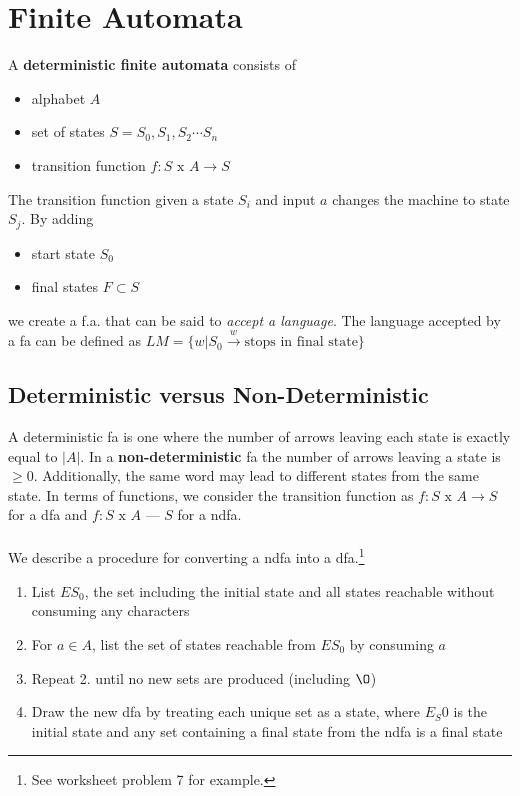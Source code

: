 \documentclass{article}
\begin{document}
	\section{Finite Automata}
		A \textbf{deterministic finite automata} consists of
		\begin{itemize}
			\item alphabet $A$
			\item set of states $S = S_0,S_1,S_2 \cdots S_n$
			\item transition function $f : S \text{ x } A \rightarrow S$
		\end{itemize}
		The transition function given a state $S_i$ and input $a$ changes the machine to state $S_j$. By adding
		\begin{itemize}
			\item start state $S_0$
			\item final states $F \subset S$
		\end{itemize}
		we create a f.a. that can be said to \emph{accept a language}. The language accepted by a fa can be defined as $LM = \{w | S_0  \overset{w}{\rightarrow} \text{stops in final state}\}$
		\subsection{Deterministic versus Non-Deterministic}
			A deterministic fa is one where the number of arrows leaving each state is exactly equal to $|A|$. In a \textbf{non-deterministic} fa the number of arrows leaving a state is $\geq 0$. Additionally, the same word may lead to different states from the same state. In terms of functions, we consider the transition function as $f : S \text{ x } A \rightarrow S$ for a dfa and $f : S \text{ x } A$ ---  $S$ for a ndfa.
			\\\\ We describe a procedure for converting a ndfa into a dfa.\footnote{See worksheet problem 7 for example.}
			\begin{enumerate}
				\item List $ES_0$, the set including the initial state and all states reachable without consuming any characters
				\item For $a \in A$, list the set of states reachable from $ES_0$ by consuming $a$
				\item Repeat 2. until no new sets are produced (including $\O$)
				\item Draw the new dfa by treating each unique set as a state, where $E_S0$ is the initial state and any set containing a final state from the ndfa is a final state
			\end{enumerate}
\end{document}
